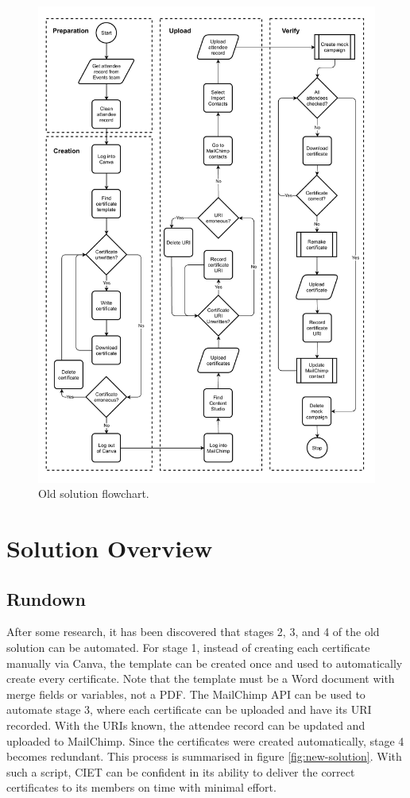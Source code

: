 \documentclass[11pt]{article}
\begin{document}
\begin{figure}[h!]
    \includegraphics[width=\textwidth]{figures/old_solution.pdf}
    \caption{Old solution flowchart.}
    \label{fig:old-solution}
\end{figure}

\newpage

\section{Solution Overview}

\subsection{Rundown}

After some research, it has been discovered that stages 2, 3, and 4 of the old solution can be automated. For stage 1, instead of creating each certificate manually via Canva, the template can be created once and used to automatically create every certificate. Note that the template must be a Word document with merge fields or variables, not a PDF. The MailChimp API can be used to automate stage 3, where each certificate can be uploaded and have its URI recorded. With the URIs known, the attendee record can be updated and uploaded to MailChimp. Since the certificates were created automatically, stage 4 becomes redundant. This process is summarised in figure \ref{fig:new-solution}. With such a script, CIET can be confident in its ability to deliver the correct certificates to its members on time with minimal effort.
\end{document}
